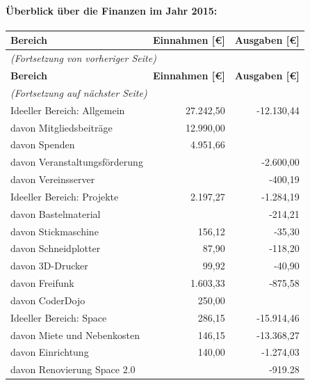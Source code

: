 \documentclass[a4paper,12pt]{scrartcl}
\begin{document}
\paragraph{Überblick über die Finanzen im Jahr 2015:}
\begin{longtable}{|l|r|r|}
  \hline
  \textbf{Bereich} & \textbf{Einnahmen [€]} & \textbf{Ausgaben [€]} \\
  \hline
  \endfirsthead
  \multicolumn{3}{l}{\emph{(Fortsetzung von vorheriger Seite)}} \\
  \hline
  \textbf{Bereich} & \textbf{Einnahmen [€]} & \textbf{Ausgaben [€]} \\
  \hline
  \endhead
  \multicolumn{3}{l}{\emph{(Fortsetzung auf nächster Seite)}} \\
  \endfoot
  \endlastfoot
  Ideeller Bereich: Allgemein       & 27{.}242{,}50 & -12{.}130{,}44 \\
  \quad davon Mitgliedsbeiträge     & 12{.}990{,}00 &                \\
  \quad davon Spenden               &  4{.}951{,}66 &                \\
  \quad davon Veranstaltungsförderung &             &  -2{.}600{,}00 \\
  \quad davon Vereinsserver         &               &      -400{,}19 \\
  \hline
  Ideeller Bereich: Projekte        &  2{.}197{,}27 &  -1{.}284{,}19 \\
  \quad davon Bastelmaterial        &               &      -214{,}21 \\
  \quad davon Stickmaschine         &      156{,}12 &       -35{,}30 \\
  \quad davon Schneidplotter        &       87{,}90 &      -118{,}20 \\
  \quad davon 3D-Drucker            &       99{,}92 &       -40{,}90 \\
  \quad davon Freifunk              &  1{.}603{,}33 &      -875{,}58 \\
  \quad davon CoderDojo             &      250{,}00 &                \\
  \hline
  Ideeller Bereich: Space           &      286{,}15 & -15{.}914{,}46 \\
  \quad davon Miete und Nebenkosten &      146{,}15 & -13{.}368{,}27 \\
  \quad davon Einrichtung           &      140{,}00 &  -1{.}274{,}03 \\
  \quad davon Renovierung Space 2.0 &               &      -919{.}28 \\

\end{longtable}
\end{document}

